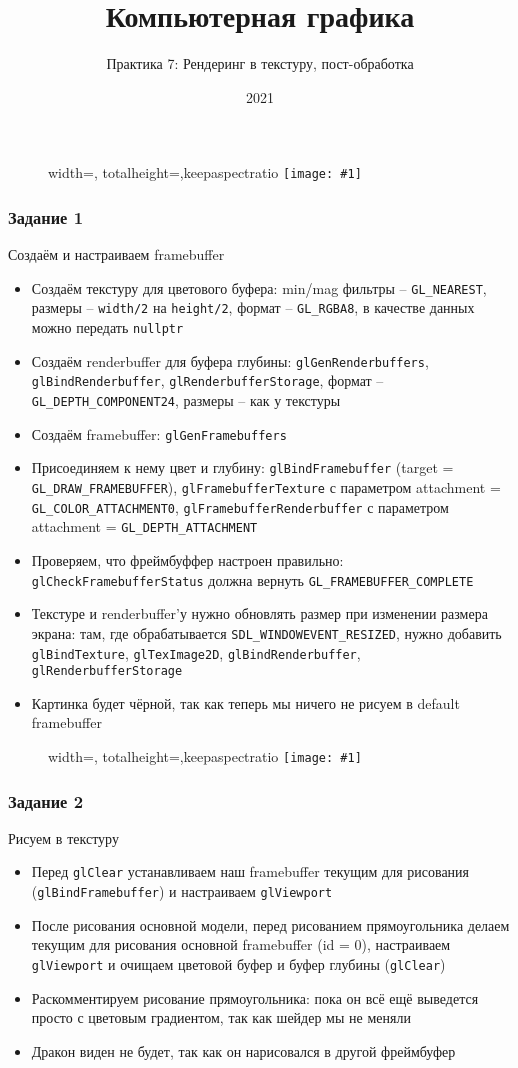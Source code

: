 \documentclass{beamer}
\title{Компьютерная графика}
\subtitle{Практика 7: Рендеринг в текстуру, пост-обработка}
\date{2021}
\newcommand{\slideimage}[1]{
  \begin{figure}
    \begin{adjustbox}{width=\textwidth, totalheight=\textheight-2\baselineskip-2\baselineskip,keepaspectratio}
      \texttt{[image: \#1]}
    \end{adjustbox}
  \end{figure}
}
\begin{document}
\frame{\titlepage}

\begin{frame}[fragile]
\slideimage{0.png}
\end{frame}

\begin{frame}[fragile]
\frametitle{Задание 1}
\fontsize{10pt}{10pt}
Создаём и настраиваем framebuffer
\begin{itemize}
\item Создаём текстуру для цветового буфера: min/mag фильтры -- \verb|GL_NEAREST|, размеры -- \verb|width/2| на \verb|height/2|, формат -- \verb|GL_RGBA8|, в качестве данных можно передать \verb|nullptr|
\item Создаём renderbuffer для буфера глубины: \verb|glGenRenderbuffers|, \verb|glBindRenderbuffer|, \verb|glRenderbufferStorage|, формат -- \verb|GL_DEPTH_COMPONENT24|, размеры -- как у текстуры
\item Создаём framebuffer: \verb|glGenFramebuffers|
\item Присоединяем к нему цвет и глубину: \verb|glBindFramebuffer| (target = \verb|GL_DRAW_FRAMEBUFFER|), \verb|glFramebufferTexture| с параметром attachment = \verb|GL_COLOR_ATTACHMENT0|, \verb|glFramebufferRenderbuffer| с параметром attachment = \verb|GL_DEPTH_ATTACHMENT|
\item Проверяем, что фреймбуффер настроен правильно: \verb|glCheckFramebufferStatus| должна вернуть \verb|GL_FRAMEBUFFER_COMPLETE|
\item Текстуре и renderbuffer'у нужно обновлять размер при изменении размера экрана: там, где обрабатывается \verb|SDL_WINDOWEVENT_RESIZED|, нужно добавить \verb|glBindTexture|, \verb|glTexImage2D|, \verb|glBindRenderbuffer|, \verb|glRenderbufferStorage|
\item Картинка будет чёрной, так как теперь мы ничего не рисуем в default framebuffer
\end{itemize}
\end{frame}

\begin{frame}[fragile]
\slideimage{1.png}
\end{frame}

\begin{frame}[fragile]
\frametitle{Задание 2}
Рисуем в текстуру
\begin{itemize}
\item Перед \verb|glClear| устанавливаем наш framebuffer текущим для рисования (\verb|glBindFramebuffer|) и настраиваем \verb|glViewport|
\item После рисования основной модели, перед рисованием прямоугольника делаем текущим для рисования основной framebuffer (id = 0), настраиваем \verb|glViewport| и очищаем цветовой буфер и буфер глубины (\verb|glClear|)
\item Раскомментируем рисование прямоугольника: пока он всё ещё выведется просто с цветовым градиентом, так как шейдер мы не меняли
\item Дракон виден не будет, так как он нарисовался в другой фреймбуфер
\end{itemize}
\end{frame}
\end{document}
